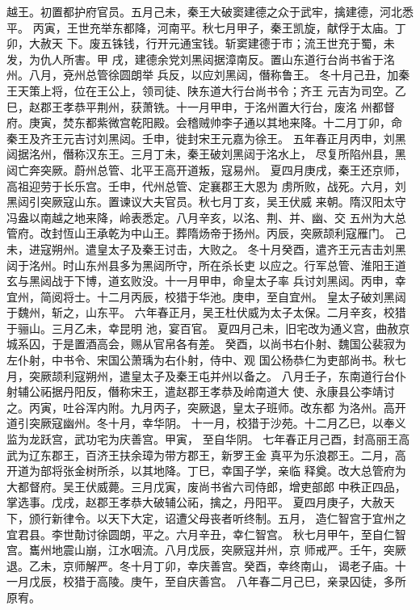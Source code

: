\documentclass[12pt,UTF8]{ctexbook}
\begin{document}
越王。初置都护府官员。五月己未，秦王大破窦建德之众于武牢，擒建德，河北悉平。
丙寅，王世充举东都降，河南平。秋七月甲子，秦王凯旋，献俘于太庙。丁卯，大赦天
下。废五铢钱，行开元通宝钱。斩窦建德于市；流王世充于蜀，未发，为仇人所害。甲
戌，建德余党刘黑闼据漳南反。置山东道行台尚书省于洺州。八月，兗州总管徐圆朗举
兵反，以应刘黑闼，僭称鲁王。
冬十月己丑，加秦王天策上将，位在王公上，领司徒、陕东道大行台尚书令；齐王
元吉为司空。乙巳，赵郡王孝恭平荆州，获萧铣。十一月甲申，于洺州置大行台，废洺
州都督府。庚寅，焚东都紫微宫乾阳殿。会稽贼帅李子通以其地来降。十二月丁卯，命
秦王及齐王元吉讨刘黑闼。壬申，徙封宋王元嘉为徐王。
五年春正月丙申，刘黑闼据洺州，僭称汉东王。三月丁未，秦王破刘黑闼于洺水上，
尽复所陷州县，黑闼亡奔突厥。蔚州总管、北平王高开道叛，寇易州。
夏四月庚戌，秦王还京师，高祖迎劳于长乐宫。壬申，代州总管、定襄郡王大恩为
虏所败，战死。六月，刘黑闼引突厥寇山东。置谏议大夫官员。秋七月丁亥，吴王伏威
来朝。隋汉阳太守冯盎以南越之地来降，岭表悉定。八月辛亥，以洺、荆、并、幽、交
五州为大总管府。改封恆山王承乾为中山王。葬隋炀帝于扬州。丙辰，突厥颉利寇雁门。
己未，进寇朔州。遣皇太子及秦王讨击，大败之。
冬十月癸酉，遣齐王元吉击刘黑闼于洺州。时山东州县多为黑闼所守，所在杀长吏
以应之。行军总管、淮阳王道玄与黑闼战于下博，道玄败没。十一月甲申，命皇太子率
兵讨刘黑闼。丙申，幸宜州，简阅将士。十二月丙辰，校猎于华池。庚申，至自宜州。
皇太子破刘黑闼于魏州，斩之，山东平。
六年春正月，吴王杜伏威为太子太保。二月辛亥，校猎于骊山。三月乙未，幸昆明
池，宴百官。
夏四月己未，旧宅改为通义宫，曲赦京城系囚，于是置酒高会，赐从官帛各有差。
癸酉，以尚书右仆射、魏国公裴寂为左仆射，中书令、宋国公萧瑀为右仆射，侍中、观
国公杨恭仁为吏部尚书。秋七月，突厥颉利寇朔州，遣皇太子及秦王屯并州以备之。
八月壬子，东南道行台仆射辅公祏据丹阳反，僭称宋王，遣赵郡王孝恭及岭南道大
使、永康县公李靖讨之。丙寅，吐谷浑内附。九月丙子，突厥退，皇太子班师。改东都
为洛州。高开道引突厥寇幽州。冬十月，幸华阴。
十一月，校猎于沙苑。十二月乙巳，以奉义监为龙跃宫，武功宅为庆善宫。甲寅，
至自华阴。
七年春正月己酉，封高丽王高武为辽东郡王，百济王扶余璋为带方郡王，新罗王金
真平为乐浪郡王。二月，高开道为部将张金树所杀，以其地降。丁巳，幸国子学，亲临
释奠。改大总管府为大都督府。吴王伏威薨。三月戊寅，废尚书省六司侍郎，增吏部郎
中秩正四品，掌选事。戊戌，赵郡王孝恭大破辅公祏，擒之，丹阳平。
夏四月庚子，大赦天下，颁行新律令。以天下大定，诏遭父母丧者听终制。五月，
造仁智宫于宜州之宜君县。李世勣讨徐圆朗，平之。六月辛丑，幸仁智宫。
秋七月甲午，至自仁智宫。巂州地震山崩，江水咽流。八月戊辰，突厥寇并州，京
师戒严。壬午，突厥退。乙未，京师解严。冬十月丁卯，幸庆善宫。癸酉，幸终南山，
谒老子庙。十一月戊辰，校猎于高陵。庚午，至自庆善宫。
八年春二月己巳，亲录囚徒，多所原宥。
\end{document}
